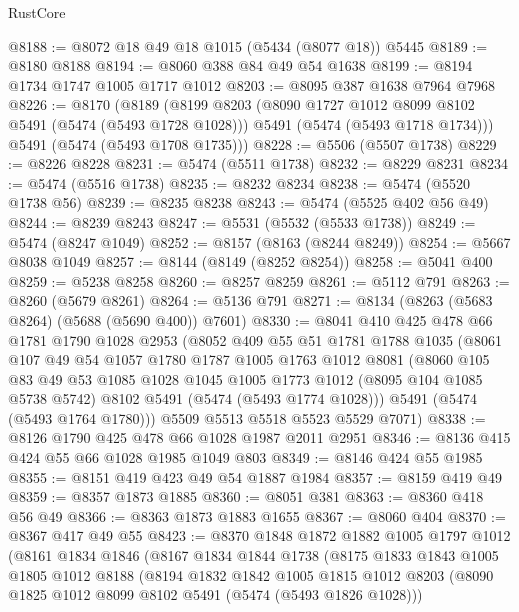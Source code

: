 \begin{lexlean}{RustCore}
\begin{coremodule}
@8188 := @8072 @18 @49 @18 @1015 (@5434 (@8077 @18)) @5445
@8189 := @8180 @8188
@8194 := @8060 @388 @84 @49 @54 @1638
@8199 := @8194 @1734 @1747 @1005 @1717 @1012
@8203 := @8095 @387 @1638 @7964 @7968
@8226 := @8170
    (@8189
      (@8199
        @8203
        (@8090 @1727 @1012 @8099 @8102 @5491 (@5474 (@5493 @1728 @1028)))
        @5491
        (@5474 (@5493 @1718 @1734)))
      @5491
      (@5474 (@5493 @1708 @1735)))
@8228 := @5506 (@5507 @1738)
@8229 := @8226 @8228
@8231 := @5474 (@5511 @1738)
@8232 := @8229 @8231
@8234 := @5474 (@5516 @1738)
@8235 := @8232 @8234
@8238 := @5474 (@5520 @1738 @56)
@8239 := @8235 @8238
@8243 := @5474 (@5525 @402 @56 @49)
@8244 := @8239 @8243
@8247 := @5531 (@5532 (@5533 @1738))
@8249 := @5474 (@8247 @1049)
@8252 := @8157 (@8163 (@8244 @8249))
@8254 := @5667 @8038 @1049
@8257 := @8144 (@8149 (@8252 @8254))
@8258 := @5041 @400
@8259 := @5238 @8258
@8260 := @8257 @8259
@8261 := @5112 @791
@8263 := @8260 (@5679 @8261)
@8264 := @5136 @791
@8271 := @8134 (@8263 (@5683 @8264) (@5688 (@5690 @400)) @7601)
@8330 := @8041
    @410
    @425
    @478
    @66
    @1781
    @1790
    @1028
    @2953
    (@8052
      @409
      @55
      @51
      @1781
      @1788
      @1035
      (@8061
        @107
        @49
        @54
        @1057
        @1780
        @1787
        @1005
        @1763
        @1012
        @8081
        (@8060
          @105
          @83
          @49
          @53
          @1085
          @1028
          @1045
          @1005
          @1773
          @1012
          (@8095 @104 @1085 @5738 @5742)
          @8102
          @5491
          (@5474 (@5493 @1774 @1028)))
        @5491
        (@5474 (@5493 @1764 @1780)))
      @5509
      @5513
      @5518
      @5523
      @5529
      @7071)
@8338 := @8126 @1790 @425 @478 @66 @1028 @1987 @2011 @2951
@8346 := @8136 @415 @424 @55 @66 @1028 @1985 @1049 @803
@8349 := @8146 @424 @55 @1985
@8355 := @8151 @419 @423 @49 @54 @1887 @1984
@8357 := @8159 @419 @49
@8359 := @8357 @1873 @1885
@8360 := @8051 @381
@8363 := @8360 @418 @56 @49
@8366 := @8363 @1873 @1883 @1655
@8367 := @8060 @404
@8370 := @8367 @417 @49 @55
@8423 := @8370
    @1848
    @1872
    @1882
    @1005
    @1797
    @1012
    (@8161
      @1834
      @1846
      (@8167
        @1834
        @1844
        @1738
        (@8175
          @1833
          @1843
          @1005
          @1805
          @1012
          @8188
          (@8194
            @1832
            @1842
            @1005
            @1815
            @1012
            @8203
            (@8090 @1825 @1012 @8099 @8102 @5491 (@5474 (@5493 @1826 @1028)))

\end{coremodule}
\end{lexlean}
